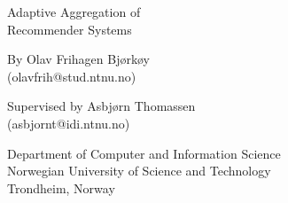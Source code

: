 \null\vspace{2em}
{
\setlength{\parindent}{0em}
\setlength{\parskip}{1em}
\centering

\HUGE
Adaptive Aggregation of\\
Recommender Systems\\
%
%
\vspace{2em}
\HUGE
\aldine
\LARGE
\vspace{2em}
\Large

By Olav Frihagen Bjørkøy\\
(olavfrih@stud.ntnu.no)\\

\vspace{1em}

Supervised by Asbjørn Thomassen\\
(asbjornt@idi.ntnu.no)\\

\vfill

Department of Computer and Information Science\\
Norwegian University of Science and Technology\\
Trondheim, Norway\\

}
\cleardoublepage

